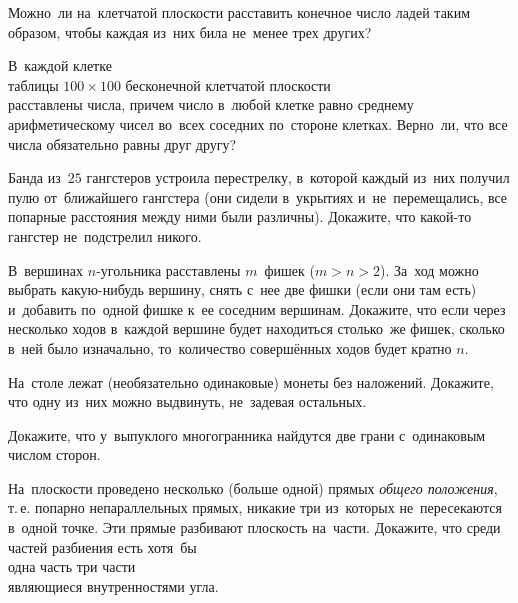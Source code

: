 


\begin{problems}

\item
Можно~ли на~клетчатой плоскости расставить конечное число ладей таким образом,
чтобы каждая из~них била не~менее трех других?

\item
В~каждой клетке
\\
\subproblem таблицы $100 \times 100$
\qquad
\subproblem бесконечной клетчатой плоскости
\\
расставлены числа, причем число в~любой клетке равно среднему арифметическому
чисел во~всех соседних по~стороне клетках.
Верно~ли, что все числа обязательно равны друг другу?

\item
Банда из~$25$ гангстеров устроила перестрелку, в~которой каждый из~них получил
пулю от~ближайшего гангстера (они сидели в~укрытиях и~не~перемещались, все
попарные расстояния между ними были различны).
Докажите, что какой-то гангстер не~подстрелил никого.


\item
В~вершинах $n$-угольника расставлены $m$~фишек ($m > n > 2$).
За~ход можно выбрать какую-нибудь вершину, снять с~нее две фишки (если они там
есть) и~добавить по~одной фишке к~ее соседним вершинам.
Докажите, что если через несколько ходов в~каждой вершине будет находиться
столько~же фишек, сколько в~ней было изначально, то~количество совершённых
ходов будет кратно $n$.

\item
На~столе лежат (необязательно одинаковые) монеты без наложений.
Докажите, что одну из~них можно выдвинуть, не~задевая остальных.

\item
Докажите, что у~выпуклого многогранника найдутся две грани с~одинаковым числом
сторон.

\item
На~плоскости проведено несколько (больше одной) прямых \emph{общего положения},
т.\,е. попарно непараллельных прямых, никакие три из~которых не~пересекаются
в~одной точке.
Эти прямые разбивают плоскость на~части.
Докажите, что среди частей разбиения есть хотя~бы
\\
\subproblem одна часть
\qquad
\subproblem три части
\\
являющиеся внутренностями угла.


\end{problems}

